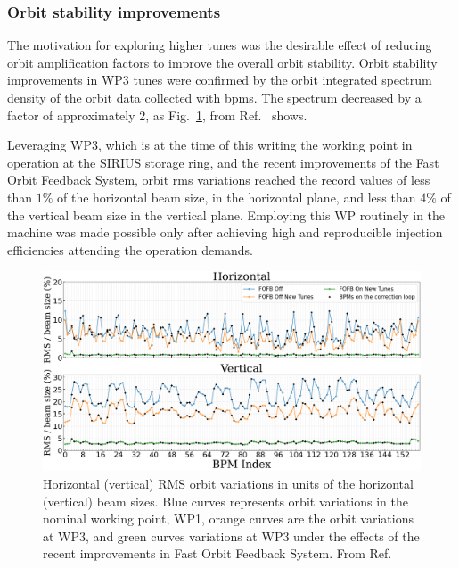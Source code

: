 \subsubsection{Orbit stability improvements}
The motivation for exploring higher tunes was the desirable effect of reducing orbit amplification factors to improve the overall orbit stability. Orbit stability improvements in \gls*{WP3} tunes were confirmed by the orbit integrated spectrum density of the orbit data collected with \glspl*{bpm}. The spectrum decreased by a factor of approximately 2, as Fig.~\ref{fig:integrated_spec}, from Ref.~\cite{liu_status_2023} shows.

Leveraging \gls*{WP3}, which is at the time of this writing the working point in operation at the SIRIUS storage ring, and the recent improvements of the Fast Orbit Feedback System, orbit rms variations reached the record values of less than $1\%$ of the horizontal beam size, in the horizontal plane, and less than $4\%$ of the vertical beam size in the vertical plane. Employing this WP routinely in the machine was made possible only after achieving high and reproducible injection efficiencies attending the operation demands.

\begin{figure}[htb]
    \centering
    \includegraphics[width=\textwidth]{Images/WEOGA2_f5.png}
    \caption[Horizontal (vertical) RMS orbit variations in units of the horizontal (vertical) beam sizes.]{Horizontal (vertical) RMS orbit variations in units of the horizontal (vertical) beam sizes. Blue curves represents orbit variations in the nominal working point, \gls*{WP1}, orange curves are the orbit variations at \gls*{WP3}, and green curves variations at \gls*{WP3} under the effects of the recent improvements in Fast Orbit Feedback System. From Ref.~\cite{liu_status_2023}}
    \label{fig:integrated_spec}
\end{figure}

